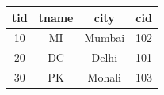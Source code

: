 \begin{tabular}{|c|c|c|c|}
\hline
tid & tname & city & cid \\ \hline
10 & MI & Mumbai & 102 \\
20 & DC & Delhi & 101 \\
30 & PK & Mohali & 103 \\ \hline
\end{tabular}
